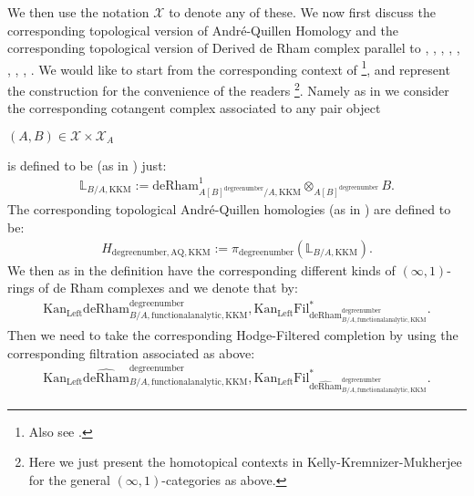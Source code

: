 \documentclass[11pt]{book}
\theoremstyle{definition}
\numberwithin{equation}{section}
\begin{document}
We then use the notation $\mathcal{X}$ to denote any of these. We now first discuss the corresponding topological version of  Andr\'e-Quillen Homology and the corresponding topological version of  Derived de Rham complex parallel to \cite[Chapitre 3]{12An1}, \cite{12An2}, \cite[Chapter 2, Chapter 8]{12B1}, \cite[Chapter 1]{12Bei}, \cite[Chapter 5]{12G1}, \cite[Chapter 3, Chapter 4]{12GL}, \cite[Chapitre II, Chapitre III]{12Ill1}, \cite[Chapitre VIII]{12Ill2}, \cite[Section 4]{12Qui}. We would like to start from the corresponding context of \cite[Section 5.2.1, Definition 5.5, Proposition 5.6, Definition 5.8, Definition 5.9]{KKM}\footnote{Also see \cite[Definition 4.4.7, Construction 4.4.10, Theorem 5.3.6, Definition 5.2.4, Corollary 5.3.9]{Ra}.}, and represent the construction for the convenience of the readers \footnote{Here we just present the homotopical contexts in Kelly-Kremnizer-Mukherjee for the general $(\infty,1)$-categories as above.}. Namely as in \cite[Section 5.2.1, Definition 5.5, Proposition 5.6]{KKM} we consider the corresponding cotangent complex associated to any pair object
\begin{center}
 $(A,B)\in \mathcal{X}\times \mathcal{X}_A$ 
\end{center} 
is defined to be (as in \cite[Section 5.2.1, Definition 5.5, Proposition 5.6]{KKM}) just:
\begin{align}
\mathbb{L}_{B/A,\textrm{KKM}}:=	\mathrm{deRham}^1_{A[B]^\text{degreenumber}/A,\textrm{KKM}}\otimes_{A[B]^\text{degreenumber}} B.
\end{align}
The corresponding topological Andr\'e-Quillen homologies (as in \cite[Section 5.2.1, Definition 5.5, Proposition 5.6]{KKM}) are defined to be:
\begin{align}
H_{\text{degreenumber},{\mathrm{AQ}},\textrm{KKM}}:=\pi_\text{degreenumber} (\mathbb{L}_{B/A,\textrm{KKM}}). 	
\end{align}
We then as in the definition \cite[Definition 5.8, Definition 5.9, Section 5.2.1]{KKM} have the corresponding different kinds of $(\infty,1)$-rings of de Rham complexes and we denote that by:
\begin{align}
\mathrm{Kan}_\mathrm{Left}\mathrm{deRham}^\text{degreenumber}_{B/A,\mathrm{functionalanalytic},\textrm{KKM}},\mathrm{Kan}_\mathrm{Left}\mathrm{Fil}^*_{\mathrm{deRham}^\text{degreenumber}_{B/A,\mathrm{functionalanalytic},\textrm{KKM}}}.	
\end{align}
Then we need to take the corresponding Hodge-Filtered completion by using the corresponding filtration associated as above:
\begin{align}
\mathrm{Kan}_\mathrm{Left}\widehat{\mathrm{deRham}}^\text{degreenumber}_{B/A,\mathrm{functionalanalytic},\mathrm{KKM}},\mathrm{Kan}_\mathrm{Left}\mathrm{Fil}^*_{\widehat{\mathrm{deRham}}^\text{degreenumber}_{B/A,\mathrm{functionalanalytic},\mathrm{KKM}}}.	
\end{align}
\end{document}
